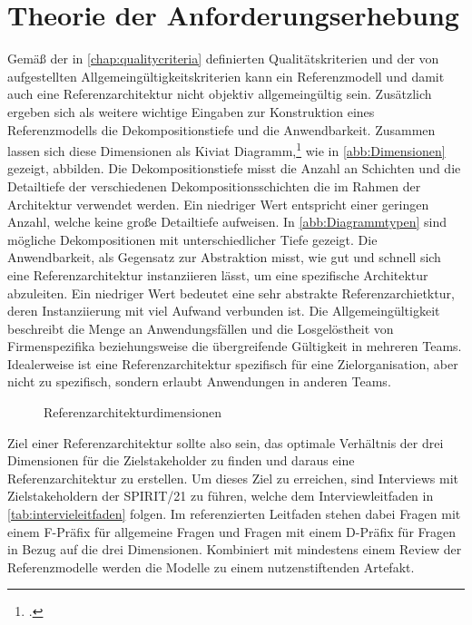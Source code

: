 \section{Theorie der Anforderungserhebung}\label{chap:requirements}

Gemäß der in \autoref{chap:qualitycriteria} definierten Qualitätskriterien und der von \citeauthor{vomBrocke.2003} aufgestellten Allgemeingültigkeitskriterien kann ein Referenzmodell und damit auch eine Referenzarchitektur nicht objektiv allgemeingültig sein. Zusätzlich ergeben sich als weitere wichtige Eingaben zur Konstruktion eines Referenzmodells die Dekompositionstiefe und die Anwendbarkeit. Zusammen lassen sich diese Dimensionen als Kiviat Diagramm,\footcite[Vgl.][33\psqq]{Kolence.1973} wie in \autoref{abb:Dimensionen} gezeigt, abbilden. Die Dekompositionstiefe misst die Anzahl an Schichten und die Detailtiefe der verschiedenen Dekompositionsschichten die im Rahmen der Architektur verwendet werden. Ein niedriger Wert entspricht einer geringen Anzahl, welche keine große Detailtiefe aufweisen. In \autoref{abb:Diagrammtypen} sind mögliche Dekompositionen mit unterschiedlicher Tiefe gezeigt. Die Anwendbarkeit, als Gegensatz zur Abstraktion misst, wie gut und schnell sich eine Referenzarchitektur instanziieren lässt, um eine spezifische Architektur abzuleiten. Ein niedriger Wert bedeutet eine sehr abstrakte Referenzarchietktur, deren Instanziierung mit viel Aufwand verbunden ist. Die Allgemeingültigkeit beschreibt die Menge an Anwendungsfällen und die Losgelöstheit von Firmenspezifika beziehungsweise die übergreifende Gültigkeit in mehreren Teams. Idealerweise ist eine Referenzarchitektur spezifisch für eine Zielorganisation, aber nicht zu spezifisch, sondern erlaubt Anwendungen in anderen Teams.

\begin{figure}[H]
\centering
{}

\caption{Referenzarchitekturdimensionen}
\label{abb:Dimensionen}
\end{figure}

Ziel einer Referenzarchitektur sollte also sein, das optimale Verhältnis der drei Dimensionen für die Zielstakeholder zu finden und daraus eine Referenzarchitektur zu erstellen. Um dieses Ziel zu erreichen, sind Interviews mit Zielstakeholdern der SPIRIT/21 zu führen, welche dem Interviewleitfaden in \autoref{tab:intervieleitfaden} folgen. Im referenzierten Leitfaden stehen dabei Fragen mit einem F-Präfix für allgemeine Fragen und Fragen mit einem D-Präfix für Fragen in Bezug auf die drei Dimensionen. Kombiniert mit mindestens einem Review der Referenzmodelle werden die Modelle zu einem nutzenstiftenden Artefakt.



